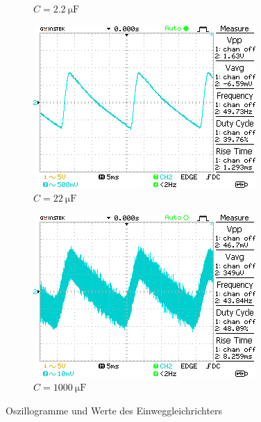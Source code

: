 \begin{figure}[H]
\begin{subfigure}[b]{0.45\textwidth}
        \caption{$C=\SI{2,2}{\micro\farad}$}
        \label{fig:3_C1}
    \end{subfigure}
    \vspace{0.5em}
    \begin{subfigure}[b]{0.45\textwidth}
        \includegraphics[width=\textwidth]{figs/3/DS0011.png}
        \caption{$C=\SI{22}{\micro\farad}$}
        \label{fig:3_C2}
    \end{subfigure}
    \hfill
    \begin{subfigure}[b]{0.45\textwidth}
        \includegraphics[width=\textwidth]{figs/3/DS0012.png}
        \caption{$C=\SI{1000}{\micro\farad}$}
        \label{fig:3_C3}
    \end{subfigure}
    \caption{Oszillogramme und Werte des Einweggleichrichters}
\end{figure}